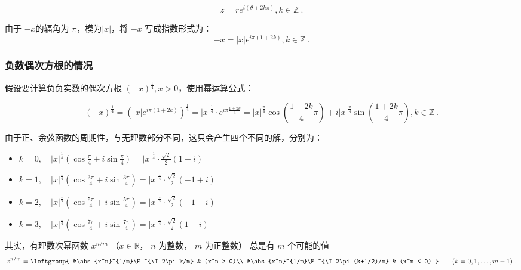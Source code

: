 \begin{equation}
z = r e^{i(\theta+2k\pi)},k\in\mathbb{Z}~.
\end{equation}

由于 $-x$的辐角为 $\pi$，模为$|x|$，将 $-x$ 写成指数形式为：
\begin{equation}
-x = |x| e^{i\pi(1+2k)},k\in\mathbb{Z}~.
\end{equation}

\subsubsection{负数偶次方根的情况}

假设要计算负负实数的偶次方根 $(-x)^{\frac{1}{4}},x>0$，使用幂运算公式：

\begin{equation}
\displaystyle
(-x)^{\frac{1}{4}} = \left( |x| e^{i\pi(1+2k)} \right)^{\frac{1}{4}} =|x|^{\frac{1}{4}} \cdot e^{i\pi\frac{1+2k}{4}}=|x|^{\frac{\pi}{4}}\cos(\frac{1+2k}{4}\pi) + i|x|^{\frac{\pi}{4}}\sin(\frac{1+2k}{4}\pi),k\in\mathbb{Z}~.
\end{equation}

由于正、余弦函数的周期性，与无理数部分不同，这只会产生四个不同的解，分别为：

\begin{itemize}
\item $\displaystyle k = 0,\quad |x|^{\frac{1}{4}} \left( \cos\frac{\pi}{4} + i\sin\frac{\pi}{4} \right) = |x|^{\frac{1}{4}} \cdot \frac{\sqrt{2}}{2} \left( 1 + i \right)$
\item $\displaystyle k = 1,\quad |x|^{\frac{1}{4}} \left( \cos\frac{3\pi}{4} + i\sin\frac{3\pi}{4} \right) = |x|^{\frac{1}{4}} \cdot \frac{\sqrt{2}}{2} \left( -1 +i \right)$
\item $\displaystyle k = 2,\quad |x|^{\frac{1}{4}} \left( \cos\frac{5\pi}{4} + i\sin\frac{5\pi}{4} \right) = |x|^{\frac{1}{4}} \cdot \frac{\sqrt{2}}{2} \left( -1 - i \right)$
\item $\displaystyle k = 3,\quad |x|^{\frac{1}{4}} \left( \cos\frac{7\pi}{4} + i\sin\frac{7\pi}{4} \right) = |x|^{\frac{1}{4}} \cdot \frac{\sqrt{2}}{2} \left( 1 - i \right)$
\end{itemize}

其实，有理数次幂函数 $x^{n/m}$ （$x\in \mathbb R$， $n$ 为整数， $m$ 为正整数） 总是有 $m$ 个可能的值
\begin{equation}
x^{n/m} = \leftgroup{
&\abs{x^n}^{1/m}\E^{\I 2\pi k/m} & (x^n > 0)\\
&\abs{x^n}^{1/m}\E^{\I 2\pi (k+1/2)/m} & (x^n < 0)
}\qquad (k = 0,1,\dots, m-1)~.
\end{equation}

